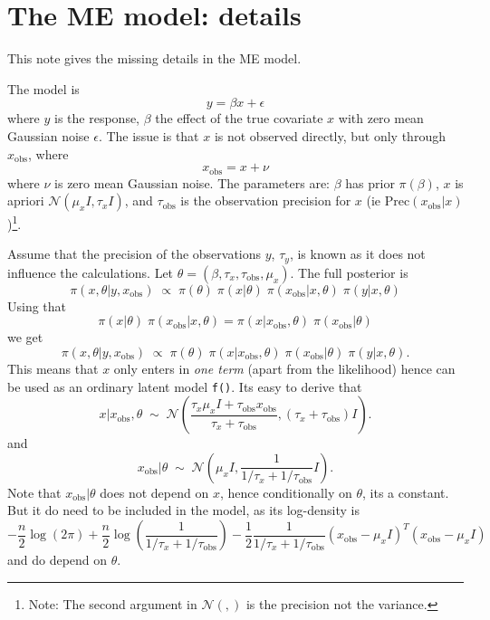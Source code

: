 \documentclass[a4paper,11pt]{article}
\def\o{_{\text{obs}}}
\begin{document}
\section*{The ME model: details}

This note gives the missing details in the ME model.

The model is
\begin{displaymath}
    y = \beta x + \epsilon{}
\end{displaymath}
where $y$ is the response, $\beta$ the effect of the true covariate
$x$ with zero mean Gaussian noise $\epsilon$. The issue is that $x$ is
not observed directly, but only through $x_{\text{obs}}$, where
\begin{displaymath}
    x\o = x + \nu{}
\end{displaymath}
where $\nu$ is zero mean Gaussian noise.  The parameters are: $\beta$
has prior $\pi(\beta)$, $x$ is apriori ${\mathcal N}(\mu_{x} {I},
\tau_{x} {I})$, and $\tau\o$ is the observation precision for $x$ (ie
$\text{Prec}(x\o|x)$)\footnote{Note: The second argument in ${\mathcal
        N}(,)$ is the precision not the variance.}.

Assume that the precision of the observations $y$, $\tau_{y}$, is
known as it does not influence the calculations. Let $\theta =
(\beta, \tau_{x}, \tau\o, \mu_{x})$.  The full posterior is
\begin{displaymath}
    \pi(x, \theta | y, x\o) \;\propto\; \pi(\theta)
    \; \pi(x |\theta) \; \pi(x\o | x, \theta) \;
    \pi(y | x, \theta)
\end{displaymath}
Using that
\begin{displaymath}
    \pi(x | \theta) \; \pi(x\o | x, \theta) = 
    \pi(x | x\o, \theta) \; \pi(x\o | \theta)
\end{displaymath}
we get
\begin{displaymath}
    \pi(x, \theta | y, x\o) \;\propto\; \pi(\theta)\; 
    \pi(x | x\o, \theta) \; \pi(x\o | \theta) \;
    \pi(y | x, \theta).
\end{displaymath}
This means that $x$ only enters in \emph{one term} (apart from the
likelihood) hence can be used as an ordinary latent model
\texttt{f()}. Its easy to derive that
\begin{displaymath}
    x | x\o, \theta \;\sim\;{\mathcal N}\left(
      \frac{\tau_{x} \mu_{x} I + \tau\o x\o}{
          \tau_{x}+\tau\o}, 
      ({\tau_{x} + \tau\o}) I \right).
\end{displaymath}
and 
\begin{displaymath}
    x\o | \theta \;\sim\; {\mathcal N}\left(
      \mu_{x}I, \frac{1}{1/\tau_{x} + 1/\tau\o} I\right).
\end{displaymath}
Note that $x\o | \theta$ does not depend on $x$, hence conditionally
on $\theta$, its a constant. But it do need to be included in the
model, as its log-density is
\begin{displaymath}
    -\frac{n}{2}\log(2\pi) + \frac{n}{2} \log(\frac{1}{1/\tau_{x} +
        1/\tau\o})
    - \frac{1}{2} \frac{1}{1/\tau_{x} + 1/\tau\o} (x\o -\mu_{x}
    I)^{T}(x\o -\mu_{x}I)
\end{displaymath}
and do depend on $\theta$.
\end{document}
